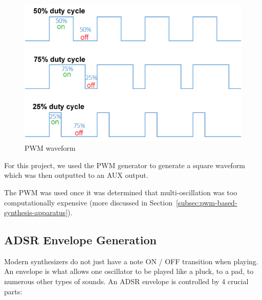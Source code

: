 \begin{figure}[H]
    \centering
    \includegraphics[width = 0.7 \textwidth]{pwmwaveform}
    \caption{PWM waveform \cite{pwm}} %
    \label{fig:pwmwaveform}
\end{figure}

For this project, we used the PWM generator to generate a square waveform which was then outputted to an AUX output.

The PWM was used once it was determined that multi-oscillation was too computationally expensive (more discussed in Section~\ref{subsec:pwm-based-synthesis-apparatus}).


\subsection{ADSR Envelope Generation}\label{subsec:envelope-generation-theory}

Modern synthesizers do not just have a note ON / OFF transition when playing. An envelope is what allows one oscillator to be played like a pluck, to a pad, to  numerous other types of sounds. An ADSR envelope is controlled by 4 crucial parts:



